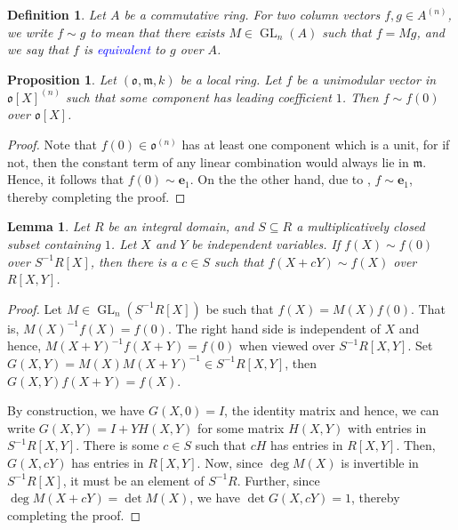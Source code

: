 \documentclass[12pt]{article}
\theoremstyle{thmstyle}
\newtheorem{lemma}[theorem]{Lemma}
\newtheorem{proposition}[theorem]{Proposition}
\theoremstyle{defstyle}
\newtheorem{definition}[theorem]{Definition}
\newcommand{\GL}{\operatorname{GL}}
\newcommand{\frakm}{\mathfrak{m}} %
\newcommand{\define}[1]{\textcolor{blue}{\textit{#1}}}
\newcommand{\frako}{\mathfrak{o}}
\begin{document}
\begin{definition}
    Let $A$ be a commutative ring. For two column vectors $f, g\in A^{(n)}$, we write $f\sim g$ to mean that there exists $M\in\GL_n(A)$ such that $f = Mg$, and we say that $f$ is \define{equivalent} to $g$ over $A$.
\end{definition}

\begin{proposition}
    Let $(\frako,\frakm, k)$ be a local ring. Let $f$ be a unimodular vector in $\frako[X]^{(n)}$ such that some component has leading coefficient $1$. Then $f\sim f(0)$ over $\frako[X]$.
\end{proposition}
\begin{proof}
    Note that $f(0)\in\frako^{(n)}$ has at least one component which is a unit, for if not, then the constant term of any linear combination would always lie in $\frakm$. Hence, it follows that $f(0)\sim \mathbf{e}_1$. On the the other hand, due to , $f\sim\mathbf{e}_1$, thereby completing the proof.
\end{proof}

\begin{lemma}
    Let $R$ be an integral domain, and $S\subseteq R$ a multiplicatively closed subset containing $1$. Let $X$ and $Y$ be independent variables. If $f(X)\sim f(0)$ over $S^{-1}R[X]$, then there is a $c\in S$ such that $f(X + cY)\sim f(X)$ over $R[X, Y]$.
\end{lemma}
\begin{proof}
    Let $M\in\GL_n(S^{-1}R[X])$ be such that $f(X) = M(X)f(0)$. That is, $M(X)^{-1}f(X) = f(0)$. The right hand side is independent of $X$ and hence, $M(X + Y)^{-1}f(X + Y) = f(0)$ when viewed over $S^{-1}R[X, Y]$. Set $G(X, Y) = M(X)M(X + Y)^{-1}\in S^{-1}R[X, Y]$, then $G(X, Y)f(X + Y) = f(X)$.

    By construction, we have $G(X, 0) = I$, the identity matrix and hence, we can write $G(X, Y) = I + YH(X, Y)$ for some matrix $H(X, Y)$ with entries in $S^{-1}R[X, Y]$. There is some $c\in S$ such that $cH$ has entries in $R[X, Y]$. Then, $G(X, cY)$ has entries in $R[X, Y]$. Now, since $\deg M(X)$ is invertible in $S^{-1}R[X]$, it must be an element of $S^{-1}R$. Further, since $\deg M(X + cY) = \det M(X)$, we have $\det G(X, cY) = 1$, thereby completing the proof.
\end{proof}
\end{document}
